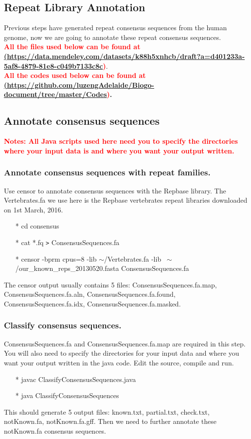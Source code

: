 \documentclass[12pt]{article}
\begin{document}
\subsection{Repeat Library Annotation}
Previous steps have generated repeat consensus sequences from the human genome, now we are going to annotate these repeat consensus sequences. \\
\textbf{\textcolor{red}{All the files used below can be found at \\
		\href{<url>}(\url{https://data.mendeley.com/datasets/k88h5xnhcb/draft?a=d401233a-5af8-4879-81e8-c049b7133c8c})}}. \\
\textbf{\textcolor{red}{All the codes used below can be found at \\ \href{<url>}(\url{https://github.com/luzengAdelaide/Biogo-document/tree/master/Codes})}.} 

\subsection{Annotate consensus sequences}
\textbf{\textcolor{red}{Notes: All Java scripts used here need you to specify the directories where your input data is and where you want your output written. }}

\subsubsection{Annotate consensus sequences with repeat families.}
Use censor to annotate consensus sequences with the Repbase library. The Vertebrates.fa we use here is the Repbase vertebrates repeat libraries downloaded on 1st March, 2016. 
\begin{enumerate}
	\item[*] cd consensus
	\item[*] cat *.fq \texttt{>} ConsensusSequences.fa 
	\item[*] censor -bprm cpus=8 -lib $\sim$/Vertebrates.fa -lib ~$\sim$/our\_known\_reps\_20130520.fasta ConsensusSequences.fa 
\end{enumerate}
The censor output usually contains 5 files: ConsensusSequences.fa.map, ConsensusSequences.fa.aln, ConsensusSequences.fa.found, ConsensusSequences.fa.idx, ConsensusSequences.fa.masked. 

\subsubsection{Classify consensus sequences.}
ConsensusSequences.fa and ConsensusSequences.fa.map are required in this step. You will also need to specify the directories for your input data and where you want your output written in the java code. Edit the source, compile and run.\\
\begin{enumerate}
	\item[*] javac ClassifyConsensusSequences.java
	\item[*] java ClassifyConsensusSequences
\end{enumerate}
This should generate 5 output files: known.txt, partial.txt, check.txt, notKnown.fa, notKnown.fa.gff. 
Then we need to further annotate these notKnown.fa consensus sequences. 
\end{document}
